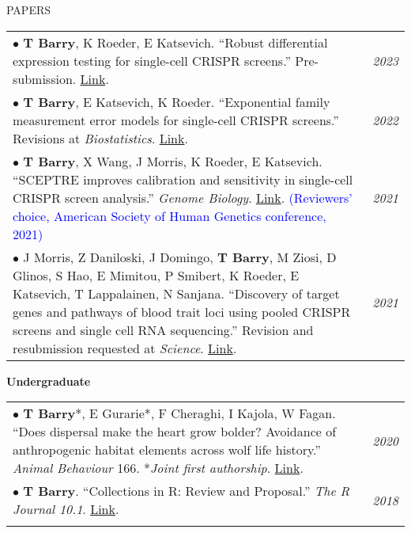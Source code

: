 \documentclass{resume} %
\begin{document}
\begin{rSection}{PAPERS}

\begin{tabular}{p{14cm}R{2.5cm}}
	$\bullet$ \textbf{T Barry}, K Roeder, E Katsevich. ``Robust differential expression testing for single-cell CRISPR screens.'' Pre-submission. \href{https://github.com/timothy-barry/timothy-barry.github.io/blob/master/sceptre_2_ms.pdf}{Link}. & \textit{2023} \\
	
	$\bullet$ \textbf{T Barry}, E Katsevich, K Roeder. “Exponential family measurement error models for single-cell CRISPR screens.” Revisions at \textit{Biostatistics}. \href{https://arxiv.org/abs/2201.01879}{Link}. & \textit{2022} \\
	 
	$\bullet$ \textbf{T Barry}, X Wang, J Morris, K Roeder, E Katsevich. ``SCEPTRE improves calibration and sensitivity in single-cell CRISPR screen analysis.'' \textit{Genome Biology}. \href{https://genomebiology.biomedcentral.com/articles/10.1186/s13059-021-02545-2}{Link}. \textcolor{blue}{(Reviewers’ choice, American Society of Human Genetics conference, 2021)} 
	& \textit{2021}  
	\\
	$\bullet$ J Morris, Z Daniloski, J Domingo, \textbf{T Barry}, M Ziosi, D Glinos, S Hao, E Mimitou, P Smibert, K Roeder, E Katsevich, T Lappalainen, N Sanjana. “Discovery of target genes and pathways of blood trait loci using pooled CRISPR screens and single cell RNA sequencing.” Revision and resubmission requested at \textit{Science}. \href{https://www.biorxiv.org/content/10.1101/2021.04.07.438882v1}{Link}.  & \textit{2021} \\
\end{tabular} 

\textbf{Undergraduate}

\begin{tabular}{p{14cm}R{2.5cm}}
	$\bullet$ \textbf{T Barry}*, E Gurarie*, F Cheraghi, I Kajola, W Fagan. ``Does dispersal make the heart grow bolder? Avoidance of anthropogenic habitat elements across wolf life history.'' \textit{Animal Behaviour} 166. *\textit{Joint first authorship}. \href{https://www.sciencedirect.com/science/article/pii/S0003347220301743}{Link}. & \textit{2020}  \\
	$\bullet$ \textbf{T Barry}. ``Collections in R: Review and Proposal.'' \textit{The R Journal 10.1}. \href{https://journal.r-project.org/archive/2018/RJ-2018-037/index.html}{Link}. & \textit{2018} \\ &
\end{tabular} 	
\end{rSection}
\end{document}

